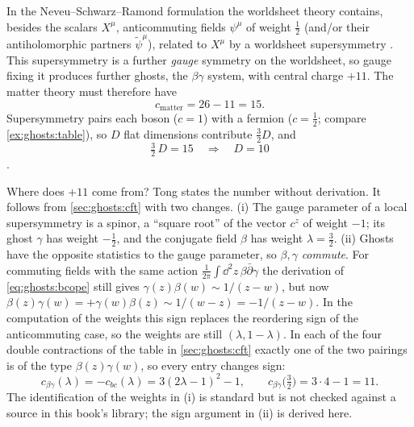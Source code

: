In the Neveu--Schwarz--Ramond formulation the worldsheet theory contains, besides the scalars
$X^\mu$, anticommuting fields $\psi^\mu$ of weight $\tfrac12$ (and/or their antiholomorphic
partners $\tilde\psi^\mu$), related to $X^\mu$ by a worldsheet supersymmetry
. This supersymmetry is a further \emph{gauge} symmetry on the
worldsheet, so gauge fixing it produces further ghosts, the $\beta\gamma$
system, with central charge $+11$.
The matter theory must therefore have
\[
  c_{\mathrm{matter}}=26-11=15 .
\]
Supersymmetry pairs each boson ($c=1$) with a fermion ($c=\tfrac12$; compare
\cref{ex:ghosts:table}), so $D$ flat dimensions contribute $\tfrac32D$, and
\begin{equation}\label{eq:ghosts:D10}
  \tfrac32\,D=15\quad\Longrightarrow\quad D=10
\end{equation}
.

Where does $+11$ come from? Tong states the number without derivation. It follows from
\cref{sec:ghosts:cft} with two changes. (i) The gauge parameter of a local supersymmetry is a
spinor, a ``square root'' of the vector $c^z$ of weight $-1$; its ghost $\gamma$ has weight
$-\tfrac12$, and the conjugate field $\beta$ has weight $\lambda=\tfrac32$. (ii) Ghosts have
the opposite statistics to the gauge parameter, so $\beta,\gamma$ \emph{commute}. For
commuting fields with the same action $\frac{1}{2\pi}\int\dd^2z\,\beta\bar\partial\gamma$ the
derivation of \cref{eq:ghosts:bcope} still gives $\gamma(z)\beta(w)\sim1/(z-w)$, but now
$\beta(z)\gamma(w)=+\gamma(w)\beta(z)\sim1/(w-z)=-1/(z-w)$. In the computation of the weights
this sign replaces the reordering sign of the anticommuting case, so the weights are still
$(\lambda,1-\lambda)$. In each of the four double contractions of the table in
\cref{sec:ghosts:cft} exactly one of the two pairings is of the type $\beta(z)\gamma(w)$, so
every entry changes sign:
\begin{equation}\label{eq:ghosts:cbg}
  c_{\beta\gamma}(\lambda)=-c_{bc}(\lambda)=3(2\lambda-1)^2-1,\qquad
  c_{\beta\gamma}\bigl(\tfrac32\bigr)=3\cdot4-1=11 .
\end{equation}
The identification of the weights in (i) is standard but is not checked against a source in
this book's library; the sign argument in (ii) is derived here.

